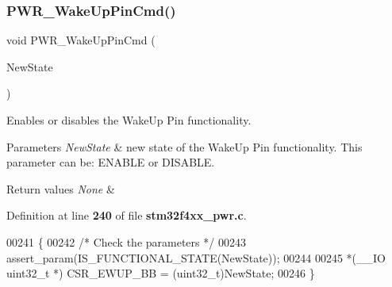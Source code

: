 \subsubsection{P\+W\+R\+\_\+\+Wake\+Up\+Pin\+Cmd()}
{\footnotesize\ttfamily void P\+W\+R\+\_\+\+Wake\+Up\+Pin\+Cmd (\begin{DoxyParamCaption}\item[{\textbf{ Functional\+State}}]{New\+State }\end{DoxyParamCaption})}



Enables or disables the Wake\+Up Pin functionality. 


\begin{DoxyParams}{Parameters}
{\em New\+State} & new state of the Wake\+Up Pin functionality. This parameter can be\+: E\+N\+A\+B\+LE or D\+I\+S\+A\+B\+LE. \\
\hline
\end{DoxyParams}

\begin{DoxyRetVals}{Return values}
{\em None} & \\
\hline
\end{DoxyRetVals}


Definition at line \textbf{ 240} of file \textbf{ stm32f4xx\+\_\+pwr.\+c}.


\begin{DoxyCode}
00241 \{
00242   \textcolor{comment}{/* Check the parameters */}  
00243   assert_param(IS_FUNCTIONAL_STATE(NewState));
00244 
00245   *(\_\_IO uint32\_t *) CSR_EWUP_BB = (uint32\_t)NewState;
00246 \}
\end{DoxyCode}

